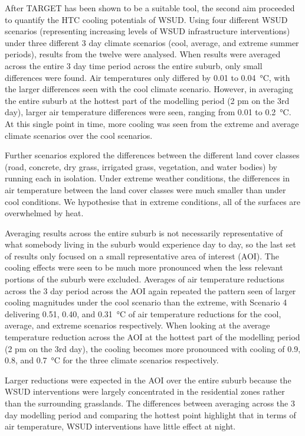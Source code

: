 \documentclass[final,3p,times,authoryear]{elsarticle}
\begin{document}
After TARGET has been shown to be a suitable tool, the second aim proceeded to quantify the HTC cooling potentials of WSUD. Using four different WSUD scenarios (representing increasing levels of WSUD infrastructure interventions) under three different 3 day climate scenarios (cool, average, and extreme summer periods), results from the twelve were analysed. When results were averaged across the entire 3 day time period across the entire suburb, only small differences were found. Air temperatures only differed by 0.01 to 0.04\SI{}{\degreeCelsius}, with the larger differences seen with the cool climate scenario. However, in averaging the entire suburb at the hottest part of the modelling period (2 pm on the 3rd day), larger air temperature differences were seen, ranging from 0.01 to 0.2\SI{}{\degreeCelsius}. At this single point in time, more cooling was seen from the extreme and average climate scenarios over the cool scenarios.
 
Further scenarios explored the differences between the different land cover classes (road, concrete, dry grass, irrigated grass, vegetation, and water bodies) by running each in isolation. Under extreme weather conditions, the differences in air temperature between the land cover classes were much smaller than under cool conditions. We hypothesise that in extreme conditions, all of the surfaces are overwhelmed by heat.

Averaging results across the entire suburb is not necessarily representative of what somebody living in the suburb would experience day to day, so the last set of results only focused on a small representative area of interest (AOI). The cooling effects were seen to be much more pronounced when the less relevant portions of the suburb were excluded. Averages of air temperature reductions across the 3 day period across the AOI again repeated the pattern seen of larger cooling magnitudes under the cool scenario than the extreme, with Scenario 4 delivering 0.51, 0.40, and 0.31\SI{}{\degreeCelsius} of air temperature reductions for the cool, average, and extreme scenarios respectively. When looking at the average temperature reduction across the AOI at the hottest part of the modelling period (2 pm on the 3rd day), the cooling becomes more pronounced with cooling of 0.9, 0.8, and 0.7\SI{}{\degreeCelsius} for the three climate scenarios respectively.

Larger reductions were expected in the AOI over the entire suburb because the WSUD interventions were largely concentrated in the residential zones rather than the surrounding grasslands. The differences between averaging across the 3 day modelling period and comparing the hottest point highlight that in terms of air temperature, WSUD interventions have little effect at night.
\end{document}
